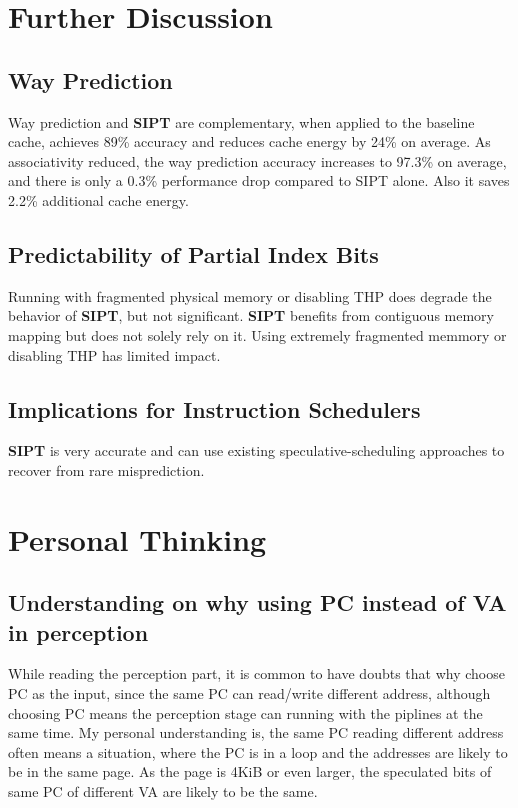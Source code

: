 \documentclass[10pt,a4paper]{article}
\begin{document}
\section{Further Discussion}
\subsection{Way Prediction}
Way prediction and \textbf{SIPT} are complementary, when applied to the baseline cache, achieves 89\% accuracy and reduces cache energy by 24\% on average. As associativity reduced, the way prediction accuracy increases to 97.3\% on average, and there is only a 0.3\% performance drop compared to SIPT alone. Also it saves 2.2\% additional cache energy.
\subsection{Predictability of Partial Index Bits}
Running with fragmented physical memory or disabling THP does degrade the behavior of \textbf{SIPT}, but not significant. \textbf{SIPT} benefits from contiguous memory mapping but does not solely rely on it. Using extremely fragmented memmory or disabling THP has limited impact.
\subsection{Implications for Instruction Schedulers}
\textbf{SIPT} is very accurate and can use existing speculative-scheduling approaches to recover from rare misprediction.

\section{Personal Thinking}
\subsection{Understanding on why using PC instead of VA in perception}
While reading the perception part, it is common to have doubts that why choose PC as the input, since the same PC can read/write different address, although choosing PC means the perception stage can running with the piplines at the same time. My personal understanding is, the same PC reading different address often means a situation, where the PC is in a loop and the addresses are likely to be in the same page. As the page is 4KiB or even larger, the speculated bits of same PC of different VA are likely to be the same.
\end{document}
